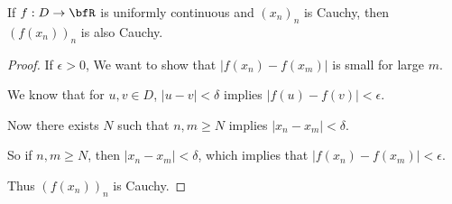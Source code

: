     \begin{lemma}
        If $f:D \rightarrow \bfR$ is uniformly continuous and $(x_n)_n$ is Cauchy, then $(f(x_n))_n$ is also Cauchy. 
    \end{lemma}
        \begin{proof}
            If $\epsilon > 0$, We want to show that $|f(x_n) - f(x_m)|$ is small for large $m$. \nl
            
            We know that for $u,v \in D$, $|u-v| < \delta$ implies $|f(u)-f(v)| < \epsilon$. \nl
            
            Now there exists $N$ such that $n,m \geq N$ implies $|x_n - x_m| < \delta$. \nl
            
            So if $n,m \geq N$, then $|x_n - x_m| < \delta$, which implies that $|f(x_n) - f(x_m)| < \epsilon$. \nl
            
            Thus $(f(x_n))_n$ is Cauchy.
        \end{proof}

